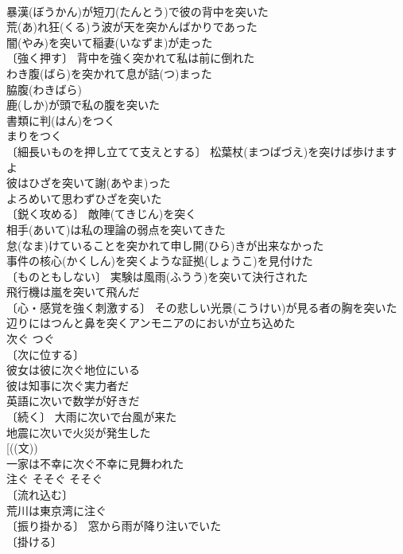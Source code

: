 \documentclass[8pt]{extreport}
\begin{document}
\begin{CJK}{UTF8}{min}
\\	暴漢(ぼうかん)が短刀(たんとう)で彼の背中を突いた 
\\	荒(あ)れ狂(くる)う波が天を突かんばかりであった 
\\	闇(やみ)を突いて稲妻(いなずま)が走った 
\\	〔強く押す〕 背中を強く突かれて私は前に倒れた 
\\	わき腹(ばら)を突かれて息が詰(つ)まった 
\\	脇腹(わきばら)　
\\	鹿(しか)が頭で私の腹を突いた 
\\	書類に判(はん)をつく 
\\	まりをつく 
\\	〔細長いものを押し立てて支えとする〕 松葉杖(まつばづえ)を突けば歩けますよ 
\\	彼はひざを突いて謝(あやま)った 
\\	よろめいて思わずひざを突いた 
\\	〔鋭く攻める〕 敵陣(てきじん)を突く 
\\	相手(あいて)は私の理論の弱点を突いてきた 
\\	怠(なま)けていることを突かれて申し開(ひら)きが出来なかった 
\\	事件の核心(かくしん)を突くような証拠(しょうこ)を見付けた 
\\	〔ものともしない〕 実験は風雨(ふうう)を突いて決行された 
\\	飛行機は嵐を突いて飛んだ 
\\	〔心・感覚を強く刺激する〕 その悲しい光景(こうけい)が見る者の胸を突いた 
\\	辺りにはつんと鼻を突くアンモニアのにおいが立ち込めた 
\\	次ぐ	つぐ	
\\	〔次に位する〕
\\	彼女は彼に次ぐ地位にいる 
\\	彼は知事に次ぐ実力者だ 
\\	英語に次いで数学が好きだ 
\\	〔続く〕 大雨に次いで台風が来た 
\\	地震に次いで火災が発生した 
\\	[((文)) 
\\	一家は不幸に次ぐ不幸に見舞われた 
\\	注ぐ	そそぐ	そそぐ 
\\	〔流れ込む〕
\\	荒川は東京湾に注ぐ 
\\	〔振り掛かる〕 窓から雨が降り注いでいた 
\\	〔掛ける〕

\end{CJK}
\end{document}
